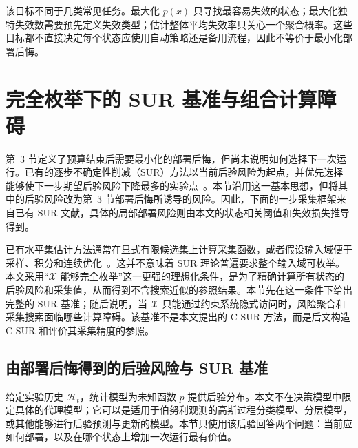 \documentclass[UTF8,11pt,a4paper,fontset=none]{ctexart}
\newcommand{\X}{\mathcal X}
\newcommand{\Hh}{\mathcal H}
\newcommand{\1}{\mathbf 1}
\begin{document}
该目标不同于几类常见任务。最大化 $p(x)$ 只寻找最容易失效的状态；最大化独特失效数需要预先定义失效类型；估计整体平均失效率只关心一个聚合概率。这些目标都不直接决定每个状态应使用自动策略还是备用流程，因此不等价于最小化部署后悔。

\section{完全枚举下的 SUR 基准与组合计算障碍}

第~3 节定义了预算结束后需要最小化的部署后悔，但尚未说明如何选择下一次运行。已有的逐步不确定性削减（SUR）方法以当前后验风险为起点，并优先选择能够使下一步期望后验风险下降最多的实验点~\cite{bect2012,chevalier2014,lyu2021}。本节沿用这一基本思想，但将其中的后验风险改为第~3 节部署后悔所诱导的风险。因此，下面的一步采集框架来自已有 SUR 文献，具体的局部部署风险则由本文的状态相关阈值和失效损失推导得到。

已有水平集估计方法通常在显式有限候选集上计算采集函数，或者假设输入域便于采样、积分和连续优化~\cite{gotovos2013,bect2012,lyu2021}。这并不意味着 SUR 理论普遍要求整个输入域可枚举。本文采用“$\X$ 能够完全枚举”这一更强的理想化条件，是为了精确计算所有状态的后验风险和采集值，从而得到不含搜索近似的参照结果。本节先在这一条件下给出完整的 SUR 基准；随后说明，当 $\X$ 只能通过约束系统隐式访问时，风险聚合和采集搜索面临哪些计算障碍。该基准不是本文提出的 C-SUR 方法，而是后文构造 C-SUR 和评价其采集精度的参照。

\subsection{由部署后悔得到的后验风险与 SUR 基准}

给定实验历史 $\Hh_t$，统计模型为未知函数 $p$ 提供后验分布。本文不在决策模型中限定具体的代理模型；它可以是适用于伯努利观测的高斯过程分类模型、分层模型，或其他能够进行后验预测与更新的模型。本节只使用该后验回答两个问题：当前应如何部署，以及在哪个状态上增加一次运行最有价值。
\end{document}
